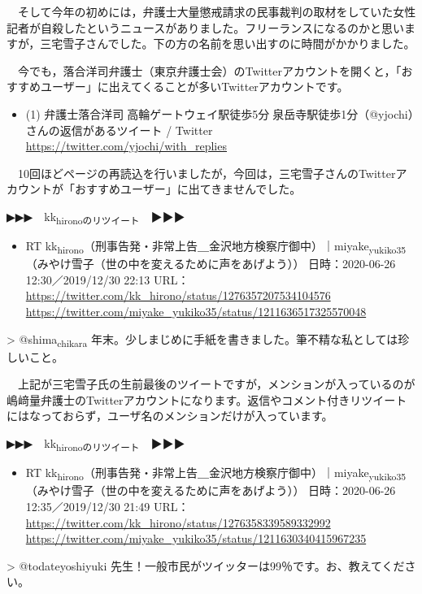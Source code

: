 \documentclass[]{ltjarticle}
\begin{document}
　そして今年の初めには，弁護士大量懲戒請求の民事裁判の取材をしていた女性記者が自殺したというニュースがありました。フリーランスになるのかと思いますが，三宅雪子さんでした。下の方の名前を思い出すのに時間がかかりました。

　今でも，落合洋司弁護士（東京弁護士会）のTwitterアカウントを開くと，「おすすめユーザー」に出えてくることが多いTwitterアカウントです。

\begin{itemize}
\item (1) 弁護士落合洋司🌸高輪ゲートウェイ駅徒歩5分🌸泉岳寺駅徒歩1分（@yjochi）さんの返信があるツイート / Twitter \url{https://twitter.com/yjochi/with\_replies}
\end{itemize}

　10回ほどページの再読込を行いましたが，今回は，三宅雪子さんのTwitterアカウントが「おすすめユーザー」に出てきませんでした。

▶▶▶　kk\textsubscript{hironoのリツイート}　▶▶▶  

\begin{itemize}
\item RT kk\textsubscript{hirono}（刑事告発・非常上告＿金沢地方検察庁御中）｜miyake\textsubscript{yukiko35}（みやけ雪子（世の中を変えるために声をあげよう）） 日時：2020-06-26 12:30／2019/12/30 22:13 URL： \url{https://twitter.com/kk\_hirono/status/1276357207534104576} \url{https://twitter.com/miyake\_yukiko35/status/1211636517325570048}
\end{itemize}

> @shima\textsubscript{chikara} 年末。少しまじめに手紙を書きました。筆不精な私としては珍しいこと。  

　上記が三宅雪子氏の生前最後のツイートですが，メンションが入っているのが嶋﨑量弁護士のTwitterアカウントになります。返信やコメント付きリツイートにはなっておらず，ユーザ名のメンションだけが入っています。

▶▶▶　kk\textsubscript{hironoのリツイート}　▶▶▶  

\begin{itemize}
\item RT kk\textsubscript{hirono}（刑事告発・非常上告＿金沢地方検察庁御中）｜miyake\textsubscript{yukiko35}（みやけ雪子（世の中を変えるために声をあげよう）） 日時：2020-06-26 12:35／2019/12/30 21:49 URL： \url{https://twitter.com/kk\_hirono/status/1276358339589332992} \url{https://twitter.com/miyake\_yukiko35/status/1211630340415967235}
\end{itemize}

> @todateyoshiyuki 先生！一般市民がツイッターは99％です。お、教えてください。  
\end{document}
